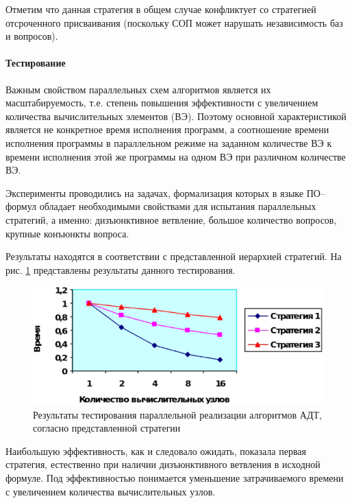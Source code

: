 Отметим что данная стратегия в общем случае конфликтует со стратегией отсроченного присваивания (поскольку СОП может нарушать независимость баз и вопросов). 

\paragraph{Тестирование}
Важным свойством параллельных схем алгоритмов является их масштабируемость, т.е. степень повышения эффективности с увеличением количества вычислительных элементов (ВЭ). Поэтому основной характеристикой является не конкретное время исполнения программ, а соотношение времени исполнения программы в параллельном режиме на заданном количестве ВЭ к времени исполнения этой же программы на одном ВЭ при различном количестве ВЭ.

Эксперименты проводились на задачах, формализация которых в языке ПО--формул обладает необходимыми свойствами для испытания параллельных стратегий, а именно: дизъюнктивное ветвление, большое количество вопросов, крупные конъюнкты вопроса.

Результаты находятся в соответствии с представленной иерархией стратегий. На рис. \ref{fig:parallel} представлены результаты данного тестирования.

\begin{figure}[h]
	\centering
	\includegraphics[width=0.6\linewidth]{pics/Parallel.eps}
	\caption{Результаты тестирования параллельной реализации алгоритмов АДТ, согласно представленной стратегии}
	\label{fig:parallel}
\end{figure}

Наибольшую эффективность, как и следовало ожидать, показала первая стратегия, естественно при наличии дизъюнктивного ветвления в исходной формуле. Под эффективностью понимается уменьшение затрачиваемого времени с увеличением количества вычислительных узлов.


